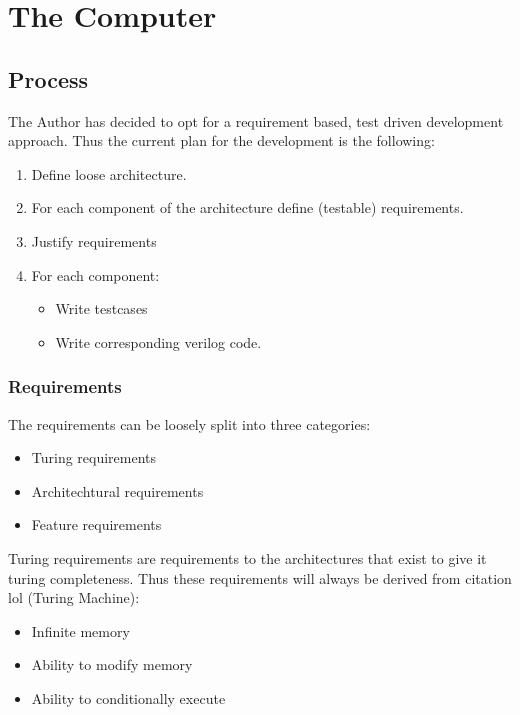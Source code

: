 \chapter{The Computer} %
\label{chap:The Computer}

\section{Process}

The Author has decided to opt for a requirement based, test driven development approach. Thus the current plan for the development is the following:
\begin{enumerate}
  \item Define loose architecture. 
  \item For each component of the architecture define (testable) requirements. 
  \item Justify requirements
  \item For each component:
  \begin{itemize}
    \item Write testcases
    \item Write corresponding verilog code.
  \end{itemize}
\end{enumerate}

\subsection{Requirements}
The requirements can be loosely split into three categories:

\begin{itemize}
  \item Turing requirements
  \item Architechtural requirements
  \item Feature requirements
\end{itemize}


\newtheorem{turing-requirement}{Turing Req.}[subsection]
Turing requirements are requirements to the architectures that exist to give it turing completeness. Thus these requirements will always be derived from citation lol (Turing Machine): 
\begin{itemize}
  \item Infinite memory
  \item Ability to modify memory
  \item Ability to conditionally execute
\end{itemize}

